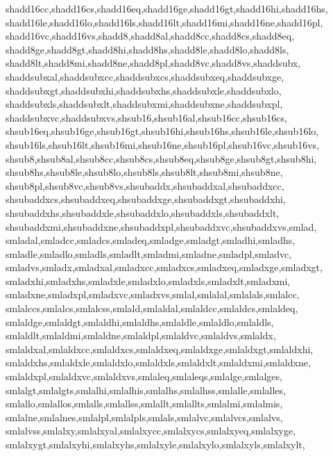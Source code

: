 {{      shadd16cc,shadd16cs,shadd16eq,shadd16ge,shadd16gt,shadd16hi,shadd16hs,  %
      shadd16le,shadd16lo,shadd16ls,shadd16lt,shadd16mi,shadd16ne,shadd16pl,  %
      shadd16vc,shadd16vs,shadd8,shadd8al,shadd8cc,shadd8cs,shadd8eq,         %
      shadd8ge,shadd8gt,shadd8hi,shadd8hs,shadd8le,shadd8lo,shadd8ls,         %
      shadd8lt,shadd8mi,shadd8ne,shadd8pl,shadd8vc,shadd8vs,shaddsubx,        %
      shaddsubxal,shaddsubxcc,shaddsubxcs,shaddsubxeq,shaddsubxge,            %
      shaddsubxgt,shaddsubxhi,shaddsubxhs,shaddsubxle,shaddsubxlo,            %
      shaddsubxls,shaddsubxlt,shaddsubxmi,shaddsubxne,shaddsubxpl,            %
      shaddsubxvc,shaddsubxvs,shsub16,shsub16al,shsub16cc,shsub16cs,          %
      shsub16eq,shsub16ge,shsub16gt,shsub16hi,shsub16hs,shsub16le,shsub16lo,  %
      shsub16ls,shsub16lt,shsub16mi,shsub16ne,shsub16pl,shsub16vc,shsub16vs,  %
      shsub8,shsub8al,shsub8cc,shsub8cs,shsub8eq,shsub8ge,shsub8gt,shsub8hi,  %
      shsub8hs,shsub8le,shsub8lo,shsub8ls,shsub8lt,shsub8mi,shsub8ne,         %
      shsub8pl,shsub8vc,shsub8vs,shsubaddx,shsubaddxal,shsubaddxcc,           %
      shsubaddxcs,shsubaddxeq,shsubaddxge,shsubaddxgt,shsubaddxhi,            %
      shsubaddxhs,shsubaddxle,shsubaddxlo,shsubaddxls,shsubaddxlt,            %
      shsubaddxmi,shsubaddxne,shsubaddxpl,shsubaddxvc,shsubaddxvs,smlad,      %
      smladal,smladcc,smladcs,smladeq,smladge,smladgt,smladhi,smladhs,        %
      smladle,smladlo,smladls,smladlt,smladmi,smladne,smladpl,smladvc,        %
      smladvs,smladx,smladxal,smladxcc,smladxcs,smladxeq,smladxge,smladxgt,   %
      smladxhi,smladxhs,smladxle,smladxlo,smladxls,smladxlt,smladxmi,         %
      smladxne,smladxpl,smladxvc,smladxvs,smlal,smlalal,smlalals,smlalcc,     %
      smlalccs,smlalcs,smlalcss,smlald,smlaldal,smlaldcc,smlaldcs,smlaldeq,   %
      smlaldge,smlaldgt,smlaldhi,smlaldhs,smlaldle,smlaldlo,smlaldls,         %
      smlaldlt,smlaldmi,smlaldne,smlaldpl,smlaldvc,smlaldvs,smlaldx,          %
      smlaldxal,smlaldxcc,smlaldxcs,smlaldxeq,smlaldxge,smlaldxgt,smlaldxhi,  %
      smlaldxhs,smlaldxle,smlaldxlo,smlaldxls,smlaldxlt,smlaldxmi,smlaldxne,  %
      smlaldxpl,smlaldxvc,smlaldxvs,smlaleq,smlaleqs,smlalge,smlalges,        %
      smlalgt,smlalgts,smlalhi,smlalhis,smlalhs,smlalhss,smlalle,smlalles,    %
      smlallo,smlallos,smlalls,smlallss,smlallt,smlallts,smlalmi,smlalmis,    %
      smlalne,smlalnes,smlalpl,smlalpls,smlals,smlalvc,smlalvcs,smlalvs,      %
      smlalvss,smlalxy,smlalxyal,smlalxycc,smlalxycs,smlalxyeq,smlalxyge,     %
      smlalxygt,smlalxyhi,smlalxyhs,smlalxyle,smlalxylo,smlalxyls,smlalxylt,  %
}}
